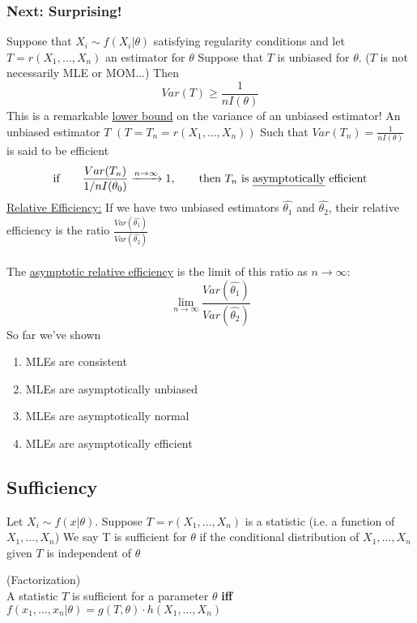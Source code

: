 \subsubsection*{Next: Surprising!}
Suppose that $X_i \sim f(X_i|\theta)$ satisfying regularity conditions and let $T = r(X_1, \ldots, X_n)$ an estimator for $\theta$ Suppose that $T$ is unbiased for $\theta$. ($T$ is not necessarily MLE or MOM...) Then
\begin{equation*}
	Var(T) \geq \frac{1}{nI(\theta)}
\end{equation*}
This is a remarkable \underline{lower bound} on the variance of an unbiased estimator! An unbiased estimator $T$ $(T = T_n = r(X_1, \ldots, X_n))$ Such that $Var(T_n) = \frac{1}{nI(\theta)}$ is said to be efficient
\begin{equation*}
	\text{if} \qquad \frac{Var(T_n)}{1/n I(\theta_0)} \xrightarrow{n \rightarrow \infty} 1, \qquad \text{then $T_n$ is \underline{asymptotically} efficient}
\end{equation*}
\underline{Relative Efficiency:} If we have two unbiased estimators $\hat{\theta_1}$ and $\hat{\theta_2}$, their relative efficiency is the ratio $\frac{Var(\hat{\theta_1})}{Var(\hat{\theta_2})}$\\\\
The \underline{asymptotic relative efficiency} is the limit of this ratio as $n \rightarrow \infty$:
\begin{equation*}
	\lim\limits_{n \rightarrow \infty}  \frac{Var(\hat{\theta_1})}{Var(\hat{\theta_2})}
\end{equation*}
So far we've shown
\begin{enumerate}
	\item MLEs are consistent
	\item MLEs are asymptotically unbiased
	\item MLEs are asymptotically normal
	\item MLEs are asymptotically efficient
\end{enumerate}
\subsection*{Sufficiency}
Let $X_i \sim f(x|\theta)$. Suppose $T = r(X_1, \ldots, X_n)$ is a statistic (i.e. a function of $X_1, \ldots, X_n$) We say T is sufficient for $\theta$ if the conditional distribution of $X_1, \ldots, X_n$ given $T$ is independent of $\theta$
\begin{theorem}
	(Factorization)\\ A statistic $T$ is sufficient for a parameter $\theta$ \textbf{iff} $f(x_1, \ldots, x_n | \theta) = g(T, \theta) \cdot h(X_1, \ldots, X_n)$ 
\end{theorem}